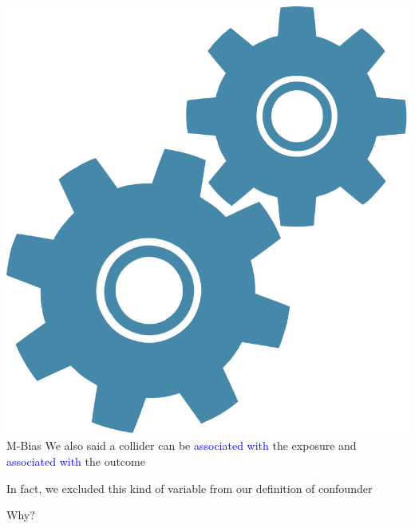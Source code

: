 \documentclass[10pt,t]{beamer}
\begin{document}
\begin{frame}{\includegraphics[scale = 0.015]{figures/technical}M-Bias}
	We also said a collider can be \textcolor{blue}{associated with} the exposure and \textcolor{blue}{associated with} the outcome 
	\medskip
	
	In fact, we excluded this kind of variable from our definition of confounder
	
	\medskip
	Why?
\end{frame}
\end{document}
